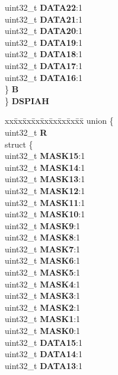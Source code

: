 \begin{DoxyCompactItemize}
\begin{tabbing}
\>\>uint32\_t {\bfseries DATA22}:1\\
\>\>uint32\_t {\bfseries DATA21}:1\\
\>\>uint32\_t {\bfseries DATA20}:1\\
\>\>uint32\_t {\bfseries DATA19}:1\\
\>\>uint32\_t {\bfseries DATA18}:1\\
\>\>uint32\_t {\bfseries DATA17}:1\\
\>\>uint32\_t {\bfseries DATA16}:1\\
\>\} {\bfseries B}\\
\} {\bfseries DSPIAH}\\

\end{tabbing}\item 
\mbox{\label{structSIU__tag_a9e91979ab2de9cc3478d5543c4bacb8c}} 
\begin{tabbing}
xx\=xx\=xx\=xx\=xx\=xx\=xx\=xx\=xx\=\kill
union \{\\
\>uint32\_t {\bfseries R}\\
\>struct \{\\
\>\>uint32\_t {\bfseries MASK15}:1\\
\>\>uint32\_t {\bfseries MASK14}:1\\
\>\>uint32\_t {\bfseries MASK13}:1\\
\>\>uint32\_t {\bfseries MASK12}:1\\
\>\>uint32\_t {\bfseries MASK11}:1\\
\>\>uint32\_t {\bfseries MASK10}:1\\
\>\>uint32\_t {\bfseries MASK9}:1\\
\>\>uint32\_t {\bfseries MASK8}:1\\
\>\>uint32\_t {\bfseries MASK7}:1\\
\>\>uint32\_t {\bfseries MASK6}:1\\
\>\>uint32\_t {\bfseries MASK5}:1\\
\>\>uint32\_t {\bfseries MASK4}:1\\
\>\>uint32\_t {\bfseries MASK3}:1\\
\>\>uint32\_t {\bfseries MASK2}:1\\
\>\>uint32\_t {\bfseries MASK1}:1\\
\>\>uint32\_t {\bfseries MASK0}:1\\
\>\>uint32\_t {\bfseries DATA15}:1\\
\>\>uint32\_t {\bfseries DATA14}:1\\
\>\>uint32\_t {\bfseries DATA13}:1\\

\end{tabbing}
\end{DoxyCompactItemize}
